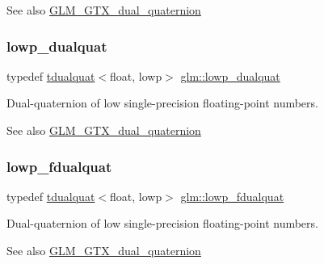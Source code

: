 \begin{DoxySeeAlso}{See also}
\hyperlink{group__gtx__dual__quaternion}{G\+L\+M\+\_\+\+G\+T\+X\+\_\+dual\+\_\+quaternion} 
\end{DoxySeeAlso}
\mbox{\label{group__gtx__dual__quaternion_ga4888200ed911e4887c2423fed74ad362}} 
\subsubsection{\texorpdfstring{lowp\+\_\+dualquat}{lowp\_dualquat}}
{\footnotesize\ttfamily typedef \hyperlink{structglm_1_1tdualquat}{tdualquat}$<$float, lowp$>$ \hyperlink{group__gtx__dual__quaternion_ga4888200ed911e4887c2423fed74ad362}{glm\+::lowp\+\_\+dualquat}}

Dual-\/quaternion of low single-\/precision floating-\/point numbers.

\begin{DoxySeeAlso}{See also}
\hyperlink{group__gtx__dual__quaternion}{G\+L\+M\+\_\+\+G\+T\+X\+\_\+dual\+\_\+quaternion} 
\end{DoxySeeAlso}
\mbox{\label{group__gtx__dual__quaternion_ga797f6d2679ab6773c1f057b97bf95111}} 
\subsubsection{\texorpdfstring{lowp\+\_\+fdualquat}{lowp\_fdualquat}}
{\footnotesize\ttfamily typedef \hyperlink{structglm_1_1tdualquat}{tdualquat}$<$float, lowp$>$ \hyperlink{group__gtx__dual__quaternion_ga797f6d2679ab6773c1f057b97bf95111}{glm\+::lowp\+\_\+fdualquat}}

Dual-\/quaternion of low single-\/precision floating-\/point numbers.

\begin{DoxySeeAlso}{See also}
\hyperlink{group__gtx__dual__quaternion}{G\+L\+M\+\_\+\+G\+T\+X\+\_\+dual\+\_\+quaternion} 
\end{DoxySeeAlso}
\mbox{\label{group__gtx__dual__quaternion_ga5727116ab20b2a1d40387766d723dd6c}} 
